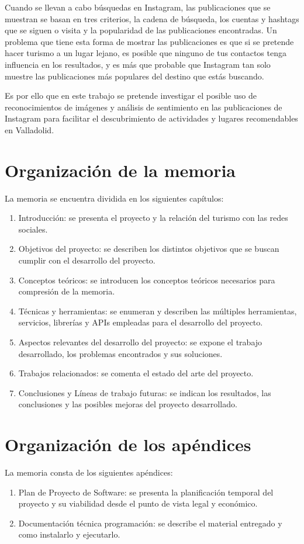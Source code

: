 Cuando se llevan a cabo búsquedas en Instagram, las publicaciones que se muestran se basan en tres criterios, la cadena de búsqueda, los cuentas y hashtags que se siguen o visita y la popularidad de las publicaciones encontradas. Un problema que tiene esta forma de mostrar las publicaciones es que si se pretende hacer turismo a un lugar lejano, es posible que ninguno de tus contactos tenga influencia en los resultados, y es más que probable que Instagram tan solo muestre las publicaciones más populares del destino que estás buscando.

Es por ello que en este trabajo se pretende investigar el posible uso de reconocimientos de imágenes y análisis de sentimiento en las publicaciones de Instagram para facilitar el descubrimiento de actividades y lugares recomendables en Valladolid.

\section{Organización de la memoria}
La memoria se encuentra dividida en los siguientes capítulos:

\begin{enumerate}
    \item Introducción: se presenta el proyecto y la relación del turismo con las redes sociales.
    \item Objetivos del proyecto: se describen los distintos objetivos que se buscan cumplir con el desarrollo del proyecto.
    \item Conceptos teóricos: se introducen los conceptos teóricos necesarios para compresión de la memoria.
    \item Técnicas y herramientas: se enumeran y describen las múltiples herramientas, servicios, librerías y APIs empleadas para el desarrollo del proyecto.
    \item Aspectos relevantes del desarrollo del proyecto: se expone el trabajo desarrollado, los problemas encontrados y sus soluciones.
    \item Trabajos relacionados: se comenta el estado del arte del proyecto.
    \item Conclusiones y Líneas de trabajo futuras: se indican los resultados, las conclusiones y las posibles mejoras del proyecto desarrollado.
\end{enumerate}

\section{Organización de los apéndices}

La memoria consta de los siguientes apéndices:

\begin{enumerate}
    \item Plan de Proyecto de Software: se presenta la planificación temporal del proyecto y su viabilidad desde el punto de vista legal y económico.
    \item Documentación técnica programación: se describe el material entregado y como instalarlo y ejecutarlo.
\end{enumerate}
